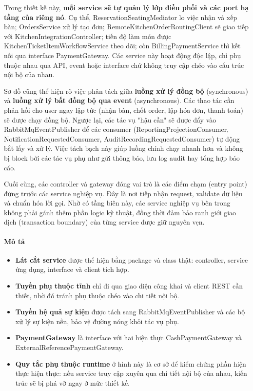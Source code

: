 Trong thiết kế này, \textbf{mỗi service sẽ tự quản lý lớp điều phối và các port hạ tầng của riêng nó}. Cụ thể, \textsf{ReservationSeatingMediator} lo việc nhận và xếp bàn; \textsf{OrdersService} xử lý tạo đơn; \textsf{RemoteKitchenOrderRoutingClient} sẽ giao tiếp với \textsf{KitchenIntegrationController}; tiến độ làm món được \textsf{KitchenTicketItemWorkflowService} theo dõi; còn \textsf{BillingPaymentService} thì kết nối qua interface \textsf{PaymentGateway}. Các service này hoạt động độc lập, chỉ phụ thuộc nhau qua API, event hoặc interface chứ không truy cập chéo vào cấu trúc nội bộ của nhau.

Sơ đồ cũng thể hiện rõ việc phân tách giữa \textbf{luồng xử lý đồng bộ} (synchronous) và \textbf{luồng xử lý bất đồng bộ qua event} (asynchronous). Các thao tác cần phản hồi cho user ngay lập tức (nhận bàn, chốt order, lập hóa đơn, thanh toán) sẽ được chạy đồng bộ. Ngược lại, các tác vụ "hậu cần" sẽ được đẩy vào \textsf{RabbitMqEventPublisher} để các consumer (\textsf{ReportingProjectionConsumer}, \textsf{NotificationRequestedConsumer}, \textsf{AuditRecordingRequestedConsumer}) tự động bắt lấy và xử lý. Việc tách bạch này giúp luồng chính chạy nhanh hơn và không bị block bởi các tác vụ phụ như gửi thông báo, lưu log audit hay tổng hợp báo cáo.

Cuối cùng, các controller và gateway đóng vai trò là các điểm chạm (entry point) đứng trước các service nghiệp vụ. Đây là nơi tiếp nhận request, validate dữ liệu và chuẩn hóa lời gọi. Nhờ có tầng biên này, các service nghiệp vụ bên trong không phải gánh thêm phần logic kỹ thuật, đồng thời đảm bảo ranh giới giao dịch (transaction boundary) của từng service được giữ nguyên vẹn.
\paragraph{Mô tả}
\begin{itemize}
  \item \textbf{Lát cắt service} được thể hiện bằng package và class thật: controller, service ứng dụng, interface và client tích hợp.
  \item \textbf{Tuyến phụ thuộc tĩnh} chỉ đi qua giao diện công khai và client REST cần thiết, nhờ đó tránh phụ thuộc chéo vào chi tiết nội bộ.
  \item \textbf{Tuyến hệ quả sự kiện} được tách sang \textsf{RabbitMqEventPublisher} và các bộ xử lý sự kiện nền, bảo vệ đường nóng khỏi tác vụ phụ.
  \item \textbf{PaymentGateway} là interface với hai hiện thực \textsf{CashPaymentGateway} và \textsf{ExternalReferencePaymentGateway}.
  \item \textbf{Quy tắc phụ thuộc runtime} ở hình này là cơ sở để kiểm chứng phần hiện thực hiện thực: nếu service truy cập xuyên qua chi tiết nội bộ của nhau, kiến trúc sẽ bị phá vỡ ngay ở mức thiết kế.
\end{itemize}



